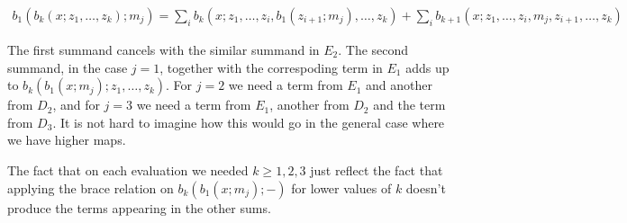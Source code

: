\documentclass[twoside]{article}
\begin{document}
\begin{align*}
b_1(b_k(x;z_1,\dots, z_k);m_j)=\sum_ib_k(x;z_1,\dots, z_i, b_1(z_{i+1};m_j),\dots, z_k)+\sum_ib_{k+1}(x;z_1,\dots, z_i,m_j,z_{i+1},\dots, z_k)
\end{align*}

The first summand cancels with the similar summand in $E_2$. The second summand, in the case $j=1$, together with the correspoding term in $E_1$ adds up to $b_k(b_1(x;m_j);z_1,\dots, z_k)$. For $j=2$ we need a term from $E_1$ and another from $D_2$, and for $j=3$ we need a term from $E_1$, another from $D_2$ and the term from $D_3$. It is not hard to imagine how this would go in the general case where we have higher maps. 

\begin{remark}
The fact that on each evaluation we needed $k\geq 1,2,3$ just reflect the fact that applying the brace relation on $b_k(b_1(x;m_j);-)$ for lower values of $k$ doesn't produce the terms appearing in the other sums. 
\end{remark}
\end{document}
